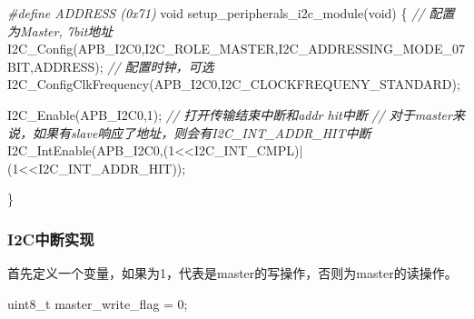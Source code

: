 \documentclass[
  12pt,
]{book}
\newenvironment{Shaded}{\begin{snugshade}}{\end{snugshade}}
\newcommand{\CommentTok}[1]{\textcolor[rgb]{0.56,0.35,0.01}{\textit{#1}}}
\newcommand{\DataTypeTok}[1]{\textcolor[rgb]{0.13,0.29,0.53}{#1}}
\newcommand{\DecValTok}[1]{\textcolor[rgb]{0.00,0.00,0.81}{#1}}
\newcommand{\NormalTok}[1]{#1}
\newcommand{\PreprocessorTok}[1]{\textcolor[rgb]{0.56,0.35,0.01}{\textit{#1}}}
\begin{document}
\begin{Shaded}
\begin{Highlighting}[]
\PreprocessorTok{#define ADDRESS (0x71)}
\DataTypeTok{void}\NormalTok{ setup_peripherals_i2c_module(}\DataTypeTok{void}\NormalTok{)}
\NormalTok{\{}
  \CommentTok{// 配置为Master, 7bit地址}
\NormalTok{  I2C_Config(APB_I2C0,I2C_ROLE_MASTER,I2C_ADDRESSING_MODE_07BIT,ADDRESS);}
  \CommentTok{// 配置时钟，可选}
\NormalTok{  I2C_ConfigClkFrequency(APB_I2C0,I2C_CLOCKFREQUENY_STANDARD);}
  
\NormalTok{  I2C_Enable(APB_I2C0,}\DecValTok{1}\NormalTok{);}
  \CommentTok{// 打开传输结束中断和addr hit中断}
  \CommentTok{// 对于master来说，如果有slave响应了地址，则会有I2C_INT_ADDR_HIT中断}
\NormalTok{  I2C_IntEnable(APB_I2C0,(}\DecValTok{1}\NormalTok{<<I2C_INT_CMPL)|(}\DecValTok{1}\NormalTok{<<I2C_INT_ADDR_HIT));}

\NormalTok{\}}
\end{Highlighting}
\end{Shaded}

\hypertarget{i2cux4e2dux65adux5b9eux73b0-4}{%
\subsubsection{I2C中断实现}\label{i2cux4e2dux65adux5b9eux73b0-4}}

首先定义一个变量，如果为1，代表是master的写操作，否则为master的读操作。

\begin{Shaded}
\begin{Highlighting}[]
\DataTypeTok{uint8_t}\NormalTok{ master_write_flag = }\DecValTok{0}\NormalTok{;}
\end{Highlighting}
\end{Shaded}
\end{document}
